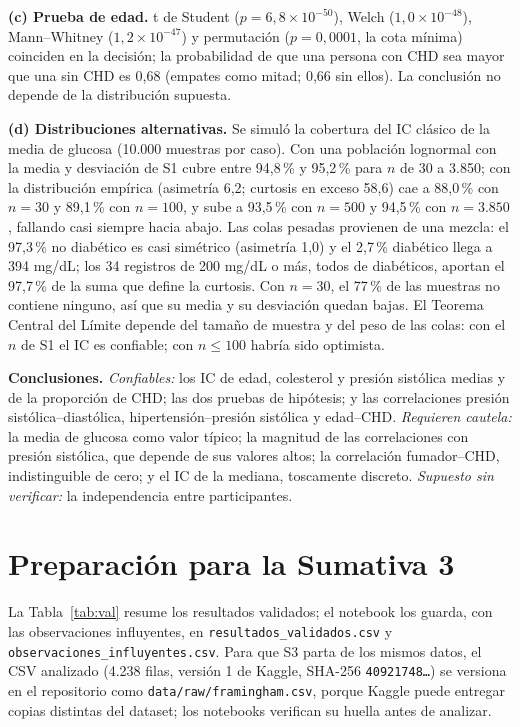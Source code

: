 \documentclass[11pt,a4paper]{article}
\begin{document}
\textbf{(c) Prueba de edad.} t de Student ($p=6{,}8\times10^{-50}$), Welch ($1{,}0\times10^{-48}$), Mann--Whitney ($1{,}2\times10^{-47}$) y permutación ($p=0{,}0001$, la cota mínima) coinciden en la decisión; la probabilidad de que una persona con CHD sea mayor que una sin CHD es 0,68 (empates como mitad; 0,66 sin ellos). La conclusión no depende de la distribución supuesta.

\textbf{(d) Distribuciones alternativas.} Se simuló la cobertura del IC clásico de la media de glucosa (10.000 muestras por caso). Con una población lognormal con la media y desviación de S1 cubre entre 94,8\,\% y 95,2\,\% para $n$ de 30 a 3.850; con la distribución empírica (asimetría 6,2; curtosis en exceso 58,6) cae a 88,0\,\% con $n=30$ y 89,1\,\% con $n=100$, y sube a 93,5\,\% con $n=500$ y 94,5\,\% con $n=3.850$, fallando casi siempre hacia abajo. Las colas pesadas provienen de una mezcla: el 97,3\,\% no diabético es casi simétrico (asimetría 1,0) y el 2,7\,\% diabético llega a 394 mg/dL; los 34 registros de 200 mg/dL o más, todos de diabéticos, aportan el 97,7\,\% de la suma que define la curtosis. Con $n=30$, el 77\,\% de las muestras no contiene ninguno, así que su media y su desviación quedan bajas. El Teorema Central del Límite depende del tamaño de muestra y del peso de las colas: con el $n$ de S1 el IC es confiable; con $n\leq100$ habría sido optimista.

\textbf{Conclusiones.} \emph{Confiables:} los IC de edad, colesterol y presión sistólica medias y de la proporción de CHD; las dos pruebas de hipótesis; y las correlaciones presión sistólica--diastólica, hipertensión--presión sistólica y edad--CHD. \emph{Requieren cautela:} la media de glucosa como valor típico; la magnitud de las correlaciones con presión sistólica, que depende de sus valores altos; la correlación fumador--CHD, indistinguible de cero; y el IC de la mediana, toscamente discreto. \emph{Supuesto sin verificar:} la independencia entre participantes.

\section{Preparación para la Sumativa 3}

\begin{sloppypar}
La Tabla~\ref{tab:val} resume los resultados validados; el notebook los guarda, con las observaciones influyentes, en \texttt{resultados\_\allowbreak validados.csv} y \texttt{observaciones\_\allowbreak influyentes.csv}. Para que S3 parta de los mismos datos, el CSV analizado (4.238 filas, versión 1 de Kaggle, SHA-256 \texttt{40921748\ldots}) se versiona en el repositorio como \texttt{data/\allowbreak raw/\allowbreak framingham.csv}, porque Kaggle puede entregar copias distintas del dataset; los notebooks verifican su huella antes de analizar.
\end{sloppypar}
\end{document}
